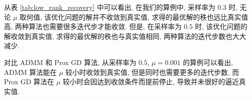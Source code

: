\documentclass{article}
\begin{document}
从表 \ref{tab:low_rank_recovery} 中可以看出, 在我们的算例中, 采样率为 $0.3$ 时, 无论 $\mu$ 取何值, 该优化问题的解并不收敛到真实值, 求得的最优解的秩也远比真实值高, 两种算法也需要很多迭代步才能收敛. 但是, 在采样率为 $0.5$ 时, 该优化问题的解收敛到真实值, 求得的最优解的秩也与真实值相同, 两种算法的迭代步数也大大减少.

对比 ADMM 和 Prox GD 算法, 从采样率为 $0.5$, $\mu=0.001$ 的算例可以看出, ADMM 算法能在 $\mu$ 较小时收敛到真实值, 但是同时也需要更多的迭代步数, 而 Prox GD 算法在 $\mu$ 较小时会因达到收敛条件而提前停止, 导致并未很好的逼近真实值.
\end{document}
